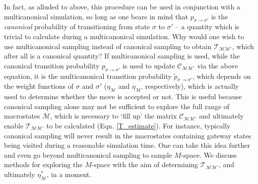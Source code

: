 \documentclass{report}
\begin{document}
In fact, as alluded to above, this procedure can be used in conjunction with a multicanonical simulation, so long as one bears in mind that
$p_{\sigma\to\sigma'}$ is the \emph{canonical} probability of transitioning from state $\sigma$ to $\sigma'$ -- a quantity which is trivial to calculate
during a multicanonical simulation.
Why would one wish to use multicanonical sampling instead of canonical sampling to obtain $\mathcal{T}_{\mathcal{MM}'}$, which after all is a canonical
quantity? If multicanonical sampling is used, while the canonical transition probability $p_{\sigma\to\sigma'}$ is used to update $\mathcal{C}_{\mathcal{M}\mathcal{M}'}$
via the above equation, it is the multicanonical transition probability $\tilde{p}_{\sigma\to\sigma'}$, which depends on the weight functions of
$\sigma$ and $\sigma'$ ($\eta_{\mathcal{M}}$ and $\eta_{\mathcal{M}'}$ respectively), which is actually used to determine whether the move is accepted or not.
This is useful because canonical sampling alone may not be sufficient to explore the full range of macrostates $\mathcal{M}$, which is necessary to 
`fill up' the matrix $\mathcal{C}_{\mathcal{M}\mathcal{M}'}$ and ultimately enable $\mathcal{T}_{\mathcal{M}\mathcal{M}'}$ to be calculated (Eqn. \eqref{T_estimate}). 
For instance, typically canonical sampling will never result in the macrostates containing gateway states being visited during a reasonable simulation
time.
One can take this idea further and even go beyond multicanonical sampling to sample $M$-space. We discuss methods for exploring the $M$-space
with the aim of determining $\mathcal{T}_{\mathcal{MM}'}$, and ultimately $\eta_{\mathcal{M}}^*$, in a moment.
\end{document}
